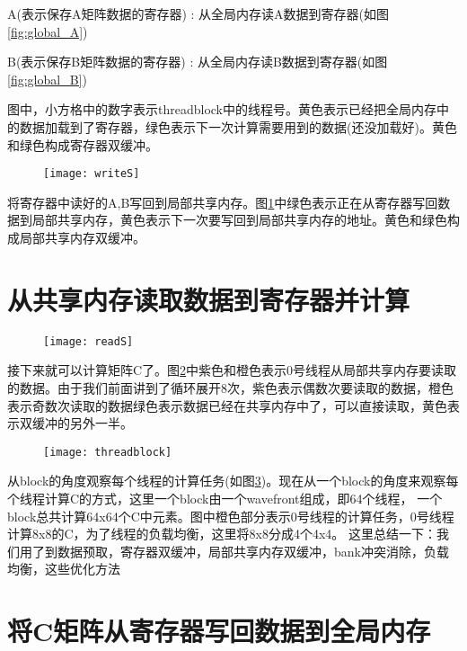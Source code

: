 A(表示保存A矩阵数据的寄存器) : 从全局内存读A数据到寄存器(如图\ref{fig:global_A})

B(表示保存B矩阵数据的寄存器) : 从全局内存读B数据到寄存器(如图\ref{fig:global_B})

图中，小方格中的数字表示threadblock中的线程号。黄色表示已经把全局内存中的数据加载到了寄存器，绿色表示下一次计算需要用到的数据(还没加载好)。黄色和绿色构成寄存器双缓冲。

\begin{figure}[htbp]
	\centering
	\texttt{[image: writeS]}
	\label{fig:writeS}
\end{figure}

将寄存器中读好的A,B写回到局部共享内存。图\ref{fig:writeS}中绿色表示正在从寄存器写回数据到局部共享内存，黄色表示下一次要写回到局部共享内存的地址。黄色和绿色构成局部共享内存双缓冲。


\section{从共享内存读取数据到寄存器并计算}
\begin{figure}[htbp]
	\centering
	\texttt{[image: readS]}
	\label{fig:readS}
\end{figure}

接下来就可以计算矩阵C了。图\ref{fig:readS}中紫色和橙色表示0号线程从局部共享内存要读取的数据。由于我们前面讲到了循环展开8次，紫色表示偶数次要读取的数据，橙色表示奇数次读取的数据绿色表示数据已经在共享内存中了，可以直接读取，黄色表示双缓冲的另外一半。

\begin{figure}[htbp]
	\centering
	\texttt{[image: threadblock]}
	\label{fig:threadblock}
\end{figure}

从block的角度观察每个线程的计算任务(如图\ref{fig:threadblock})。现在从一个block的角度来观察每个线程计算C的方式，这里一个block由一个wavefront组成，即64个线程， 一个block总共计算64x64个C中元素。图中橙色部分表示0号线程的计算任务，0号线程计算8x8的C，为了线程的负载均衡，这里将8x8分成4个4x4。
这里总结一下：我们用了到数据预取，寄存器双缓冲，局部共享内存双缓冲，bank冲突消除，负载均衡，这些优化方法


\section{将C矩阵从寄存器写回数据到全局内存}

